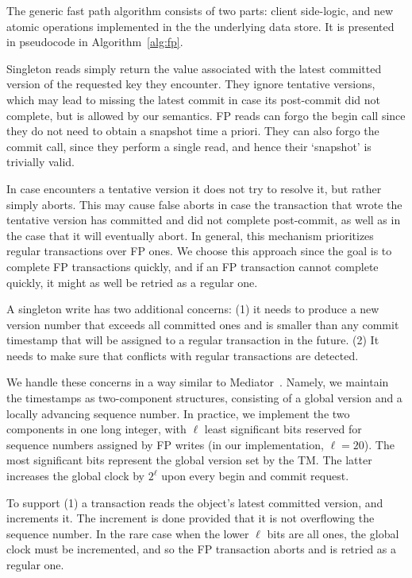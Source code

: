 The generic fast  path algorithm consists of two parts: 
client side-logic, and new atomic operations implemented in the the underlying data store.
It is presented in pseudocode in Algorithm~\ref{alg:fp}. 

Singleton reads simply return the value associated with the  latest committed version of the requested key they encounter.  
They ignore tentative versions, which may lead to missing the latest commit in case its post-commit did not complete, 
but is allowed by our semantics. 
FP reads can forgo the begin call since they do not need to obtain a snapshot time a priori. 
They can also forgo the commit call, since they perform a single read, and hence their `snapshot' is trivially valid.

In case   encounters a tentative version it does not try to resolve it, but rather simply aborts.
This may cause false aborts in case the transaction that wrote the tentative version has committed and did not 
complete post-commit, as well as in the case that it will eventually abort. 
In general, this mechanism prioritizes regular transactions over FP ones. We choose this approach since
the goal is to complete FP transactions quickly, and if an FP transaction cannot complete quickly, it might as well be 
retried as a regular one.
   
A singleton write has two additional concerns: (1) it needs to  produce a new version number that exceeds all committed ones and
is smaller than any commit timestamp that will be assigned to a regular transaction in the future.
(2)  It needs to make sure that conflicts with regular transactions are detected. 

We handle these concerns in a way similar to Mediator~\cite{mediator}.
Namely, we maintain the timestamps as two-component structures, consisting of a global version and a locally advancing sequence number.
In practice, we implement the two components in one long integer, with $\ell$ least significant bits
reserved for sequence numbers assigned by FP writes (in our implementation, $\ell=20$).
The most significant bits represent the global version set by the TM. The latter increases 
the global clock by $2^\ell$ upon every begin and commit request.

To support (1) a {} transaction reads the object's latest committed version, and increments it. 
The increment is done provided that it is not overflowing the sequence number. 
In the rare case when the lower $\ell$ bits are all ones, the global clock must be incremented, and so the FP transaction aborts and is retried as a regular one. 


